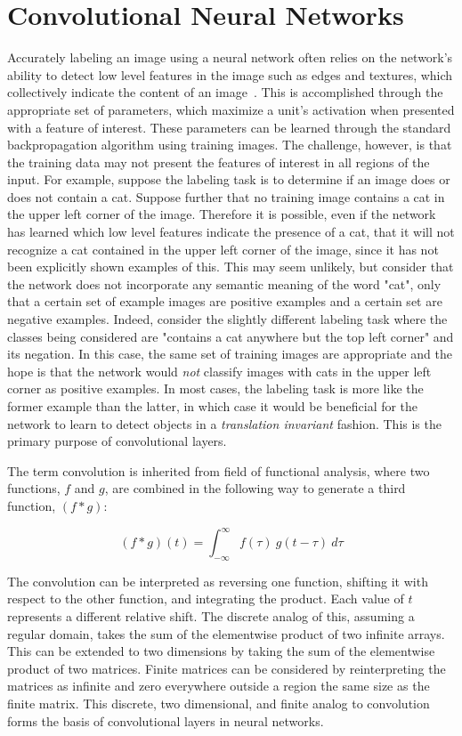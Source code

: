 \section{Convolutional Neural Networks}

Accurately labeling an image using a neural network often relies on the network's ability to detect low level features in the image such as edges and textures, which collectively indicate the content of an image~\cite{ng2011}.
This is accomplished through the appropriate set of parameters, which maximize a unit's activation when presented with a feature of interest.
These parameters can be learned through the standard backpropagation algorithm using training images. 
The challenge, however, is that the training data may not present the features of interest in all regions of the input. 
For example, suppose the labeling task is to determine if an image does or does not contain a cat.
Suppose further that no training image contains a cat in the upper left corner of the image.
Therefore it is possible, even if the network has learned which low level features indicate the presence of a cat, that it will not recognize a cat contained in the upper left corner of the image, since it has not been explicitly shown examples of this.
This may seem unlikely, but consider that the network does not incorporate any semantic meaning of the word "cat", only that a certain set of example images are positive examples and a certain set are negative examples.
Indeed, consider the slightly different labeling task where the classes being considered are "contains a cat anywhere but the top left corner" and its negation.
In this case, the same set of training images are appropriate and the hope is that the network would \textit{not} classify images with cats in the upper left corner as positive examples.
In most cases, the labeling task is more like the former example than the latter, in which case it would be beneficial for the network to learn to detect objects in a \textit{translation invariant} fashion. 
This is the primary purpose of convolutional layers.

The term convolution is inherited from field of functional analysis, where two functions, $f$ and $g$, are combined in the following way to generate a third function, $(f*g)$:

\begin{equation}
(f*g)(t) = \int_{-\infty}^{\infty}f(\tau)~g(t-\tau)~d\tau
\label{eq:math_conv}
\end{equation}

\noindent
The convolution can be interpreted as reversing one function, shifting it with respect to the other function, and integrating the product. 
Each value of $t$ represents a different relative shift.
The discrete analog of this, assuming a regular domain, takes the sum of the elementwise product of two infinite arrays.
This can be extended to two dimensions by taking the sum of the elementwise product of two matrices.
Finite matrices can be considered by reinterpreting the matrices as infinite and zero everywhere outside a region the same size as the finite matrix.
This discrete, two dimensional, and finite analog to convolution forms the basis of convolutional layers in neural networks.

